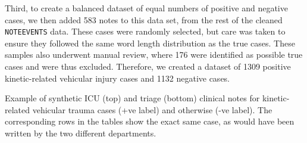 \documentclass[a4paper,12pt]{article}
\begin{document}
Third, to create a balanced dataset of equal numbers of positive and negative cases, we then added 583 notes to this data set, from the rest of the cleaned \texttt{NOTEEVENTS} data. 
These cases were randomly selected, but care was taken to ensure they followed the same word length distribution as the true cases. 
These samples also underwent manual review, where 176 were identified as possible true cases  and were thus excluded. 
Therefore, we created a dataset of 1309 positive kinetic-related vehicular injury cases and 1132 negative cases. 

    
\begin{table}[btp]
    \caption{Example of synthetic ICU (top) and triage (bottom) clinical notes for kinetic-related vehicular trauma cases (+ve label) and otherwise (-ve label). The corresponding rows in the tables show the exact same case, as would have been written by the two different departments. }
    \label{tab:exampleNotes}
    

\end{table}
\end{document}
